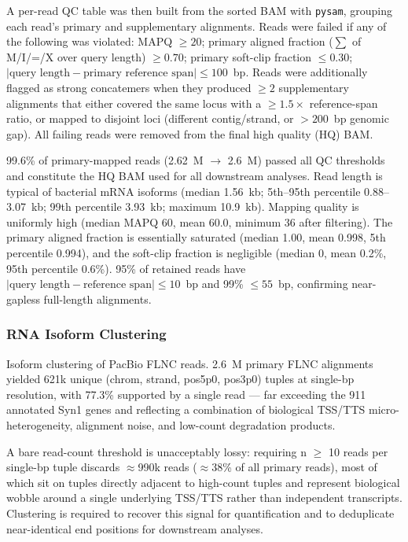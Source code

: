 A per-read QC table was then built from the sorted BAM with \texttt{pysam}, grouping each read's primary and supplementary alignments. Reads were failed if any of the following was violated: MAPQ $\geq 20$; primary aligned fraction ($\sum$ of M/I/=/X over query length) $\geq 0.70$; primary soft-clip fraction $\leq 0.30$; $|\text{query length} - \text{primary reference span}| \leq 100$~bp. Reads were additionally flagged as strong concatemers when they produced $\geq 2$ supplementary alignments that either covered the same locus with a $\geq 1.5\times$ reference-span ratio, or mapped to disjoint loci (different contig/strand, or $>200$~bp genomic gap). All failing reads were removed from the final high quality (HQ) BAM.

99.6\% of primary-mapped reads (2.62~M $\rightarrow$ 2.6~M) passed all QC thresholds and constitute the HQ BAM used for all downstream analyses. Read length is typical of bacterial mRNA isoforms (median 1.56~kb; 5th--95th percentile 0.88--3.07~kb; 99th percentile 3.93~kb; maximum 10.9~kb). Mapping quality is uniformly high (median MAPQ 60, mean 60.0, minimum 36 after filtering). The primary aligned fraction is essentially saturated (median 1.00, mean 0.998, 5th percentile 0.994), and the soft-clip fraction is negligible (median 0, mean 0.2\%, 95th percentile 0.6\%). 95\% of retained reads have $|\text{query length} - \text{reference span}| \leq 10$~bp and 99\% $\leq 55$~bp, confirming near-gapless full-length alignments.

\subsubsection{RNA Isoform Clustering}

Isoform clustering of PacBio FLNC reads. 2.6~M primary FLNC alignments yielded 621k unique (chrom, strand, pos5p0, pos3p0) tuples at single-bp resolution, with 77.3\% supported by a single read — far exceeding the 911 annotated Syn1 genes and reflecting a combination of biological TSS/TTS micro-heterogeneity, alignment noise, and low-count degradation products.                                 

A bare read-count threshold is unacceptably lossy: requiring n $\geq$ 10 reads per single-bp tuple discards $\approx$990k reads ($\approx$38\% of all primary reads), most of which sit on tuples directly adjacent to high-count tuples and represent biological wobble around a single underlying TSS/TTS rather than independent transcripts. Clustering is required to recover this signal for quantification and to deduplicate near-identical end positions for downstream analyses.

